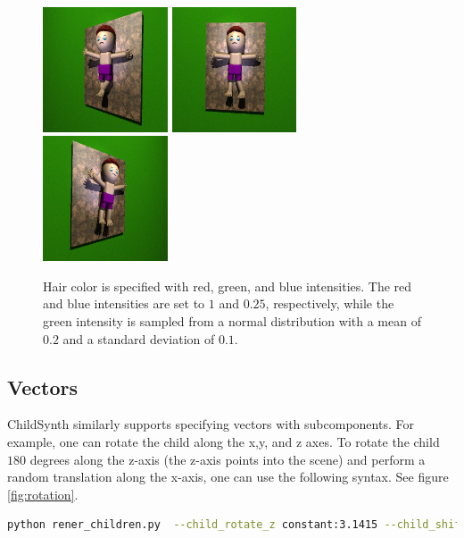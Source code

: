 \documentclass{article}
\begin{document}
\begin{figure}[htbp]
    \centering
    \includegraphics[height=3.7cm]{plots/child_000000_rgb_060.png}
    \includegraphics[height=3.7cm]{plots/child_000000_rgb_090.png}
    \includegraphics[height=3.7cm]{plots/child_000000_rgb_120.png}
    \caption{Hair color is specified with red, green, and blue intensities. The red and blue intensities are set to $1$ and $0.25$, respectively, while the green intensity is sampled from a normal distribution with a mean of $0.2$ and a standard deviation of $0.1$.}
    \label{fig:red_hair}
\end{figure}

\subsection{Vectors}

ChildSynth similarly supports specifying vectors with subcomponents. For example, one can rotate the child along the x,y, and z axes. To rotate the child $180$ degrees along the z-axis (the z-axis points into the scene) and perform a random translation along the x-axis, one can use the following syntax. See figure \ref{fig:rotation}.


\begin{lstlisting}[language=bash]
python rener_children.py  --child_rotate_z constant:3.1415 --child_shift_x unif:-1.0,1.0\end{lstlisting}
\end{document}
